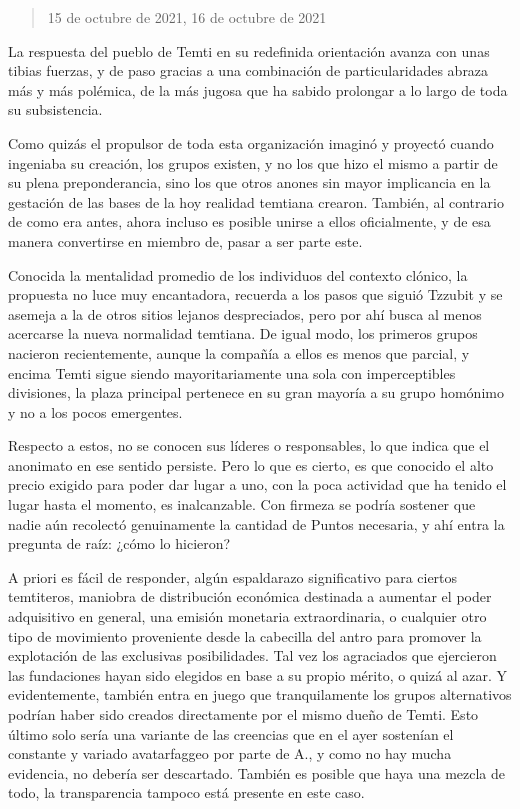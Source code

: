 \documentclass[
]{book}
\begin{document}
\begin{quote}
15 de octubre de 2021, 16 de octubre de 2021
\end{quote}

La respuesta del pueblo de Temti en su redefinida orientación avanza con unas tibias fuerzas, y de paso gracias a una combinación de particularidades abraza más y más polémica, de la más jugosa que ha sabido prolongar a lo largo de toda su subsistencia.

Como quizás el propulsor de toda esta organización imaginó y proyectó cuando ingeniaba su creación, los grupos existen, y no los que hizo el mismo a partir de su plena preponderancia, sino los que otros anones sin mayor implicancia en la gestación de las bases de la hoy realidad temtiana crearon. También, al contrario de como era antes, ahora incluso es posible unirse a ellos oficialmente, y de esa manera convertirse en miembro de, pasar a ser parte este.

Conocida la mentalidad promedio de los individuos del contexto clónico, la propuesta no luce muy encantadora, recuerda a los pasos que siguió Tzzubit y se asemeja a la de otros sitios lejanos despreciados, pero por ahí busca al menos acercarse la nueva normalidad temtiana. De igual modo, los primeros grupos nacieron recientemente, aunque la compañía a ellos es menos que parcial, y encima Temti sigue siendo mayoritariamente una sola con imperceptibles divisiones, la plaza principal pertenece en su gran mayoría a su grupo homónimo y no a los pocos emergentes.

Respecto a estos, no se conocen sus líderes o responsables, lo que indica que el anonimato en ese sentido persiste. Pero lo que es cierto, es que conocido el alto precio exigido para poder dar lugar a uno, con la poca actividad que ha tenido el lugar hasta el momento, es inalcanzable. Con firmeza se podría sostener que nadie aún recolectó genuinamente la cantidad de Puntos necesaria, y ahí entra la pregunta de raíz: ¿cómo lo hicieron?

A priori es fácil de responder, algún espaldarazo significativo para ciertos temtiteros, maniobra de distribución económica destinada a aumentar el poder adquisitivo en general, una emisión monetaria extraordinaria, o cualquier otro tipo de movimiento proveniente desde la cabecilla del antro para promover la explotación de las exclusivas posibilidades. Tal vez los agraciados que ejercieron las fundaciones hayan sido elegidos en base a su propio mérito, o quizá al azar. Y evidentemente, también entra en juego que tranquilamente los grupos alternativos podrían haber sido creados directamente por el mismo dueño de Temti. Esto último solo sería una variante de las creencias que en el ayer sostenían el constante y variado avatarfaggeo por parte de A., y como no hay mucha evidencia, no debería ser descartado. También es posible que haya una mezcla de todo, la transparencia tampoco está presente en este caso.
\end{document}
